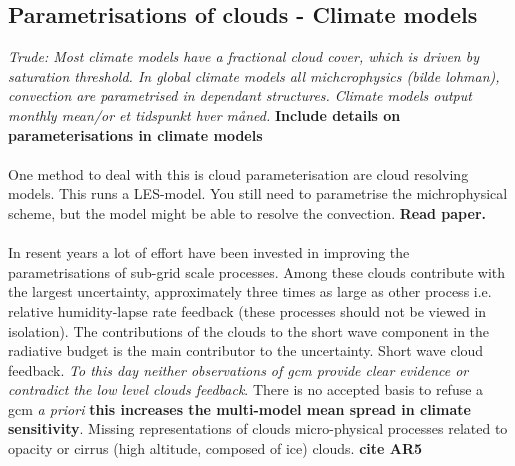 \subsection{Parametrisations of clouds - Climate models} \label{sec:params_climate_models}
\textit{Trude: Most climate models have a fractional cloud cover, which is driven by saturation threshold. In global climate models all michcrophysics (bilde lohman), convection are parametrised in dependant structures. Climate models output monthly mean/or et tidspunkt hver måned.}
\textbf{Include details on parameterisations in climate models}
\\ \\ 
One method to deal with this is cloud parameterisation are cloud resolving models. This runs a LES-model. You still need to parametrise the michrophysical scheme, but the model might be able to resolve the convection. \textbf{Read paper.}
\\ \\
In resent years a lot of effort have been invested in improving the parametrisations of sub-grid scale processes. Among these clouds contribute with the largest uncertainty, approximately three times as large as other process i.e. relative humidity-lapse rate feedback (these processes should not be viewed in isolation). The contributions of the clouds to the short wave component in the radiative budget is the main contributor to the uncertainty. Short wave cloud feedback. \textit{To this day neither observations of \acrfull{gcm} provide clear evidence or contradict the low level clouds feedback}. There is no accepted basis to refuse a \acrshort{gcm} \textit{a priori} \textbf{this increases the multi-model mean spread in climate sensitivity}. Missing representations of clouds micro-physical processes related to opacity or cirrus (high altitude, composed of ice) clouds. \textbf{cite AR5}
